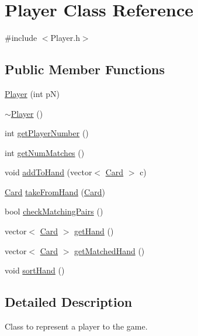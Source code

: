 \hypertarget{class_player}{\section{Player Class Reference}
\label{class_player}
}


{\ttfamily \#include $<$Player.\-h$>$}

\subsection*{Public Member Functions}
\begin{DoxyCompactItemize}
\item 
\hyperlink{class_player_a80d1293f6f49b886db318f1dae7be23b}{Player} (int p\-N)
\item 
\hyperlink{class_player_a749d2c00e1fe0f5c2746f7505a58c062}{$\sim$\-Player} ()
\item 
int \hyperlink{class_player_ae72235dee0a2f7abbcb82002164623aa}{get\-Player\-Number} ()
\item 
int \hyperlink{class_player_abdea2b45e1a98e9942bdaca85f451734}{get\-Num\-Matches} ()
\item 
void \hyperlink{class_player_ace93c12489cea500770591ccb47a2a0c}{add\-To\-Hand} (vector$<$ \hyperlink{class_card}{Card} $>$ c)
\item 
\hyperlink{class_card}{Card} \hyperlink{class_player_aa98f63d75da7cae403510b4c1e2a6ce9}{take\-From\-Hand} (\hyperlink{class_card}{Card})
\item 
bool \hyperlink{class_player_adf635ce5997b0d4647a6f7d09b526dac}{check\-Matching\-Pairs} ()
\item 
vector$<$ \hyperlink{class_card}{Card} $>$ \hyperlink{class_player_a6ca673336972f29fdc094b3f0f1f7f84}{get\-Hand} ()
\item 
vector$<$ \hyperlink{class_card}{Card} $>$ \hyperlink{class_player_a09fbf15e6a001feea60cb53d02ec3912}{get\-Matched\-Hand} ()
\item 
void \hyperlink{class_player_a2369527c90f1168eac2dc3f7bfaefc43}{sort\-Hand} ()
\end{DoxyCompactItemize}


\subsection{Detailed Description}
Class to represent a player to the game. 

